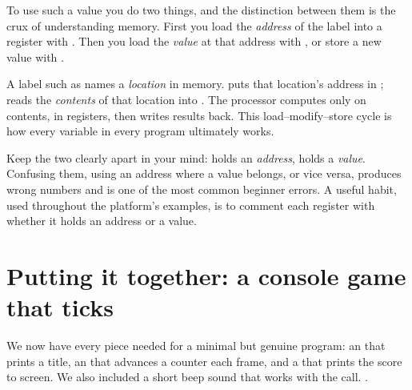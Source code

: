 

To use such a value you do two things, and the distinction between them is the
crux of understanding memory. First you load the \emph{address} of the label into
a register with . Then you load the \emph{value} at that address with
, or store a new value with .



\begin{prgconcept}
A label such as  names a \emph{location} in memory.  puts that location's address in ;  reads the
\emph{contents} of that location into . The processor computes only on
contents, in registers, then writes results back. This load--modify--store cycle
is how every variable in every program ultimately works.
\end{prgconcept}

\begin{prgwarn}
Keep the two clearly apart in your mind:  holds an \emph{address}, 
holds a \emph{value}. Confusing them, using an address where a value belongs, or
vice versa, produces wrong numbers and is one of the most common beginner errors.
A useful habit, used throughout the platform's examples, is to comment each
register with whether it holds an address or a value.
\end{prgwarn}

\section{Putting it together: a console game that ticks}

We now have every piece needed for a minimal but genuine program: an 
that prints a title, an  that advances a counter each frame, and a
 that prints the score to screen.
We also included a short beep sound that works with the  call.
\citep{prg32tutorialascii}.

